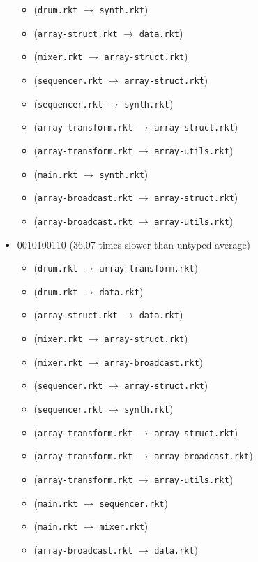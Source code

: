 \documentclass{article}
\newcommand{\mono}[1]{\texttt{#1}}
\begin{document}
\begin{itemize}
\begin{itemize}
  \item (\mono{drum.rkt} $\rightarrow$ \mono{synth.rkt})
  \item (\mono{array-struct.rkt} $\rightarrow$ \mono{data.rkt})
  \item (\mono{mixer.rkt} $\rightarrow$ \mono{array-struct.rkt})
  \item (\mono{sequencer.rkt} $\rightarrow$ \mono{array-struct.rkt})
  \item (\mono{sequencer.rkt} $\rightarrow$ \mono{synth.rkt})
  \item (\mono{array-transform.rkt} $\rightarrow$ \mono{array-struct.rkt})
  \item (\mono{array-transform.rkt} $\rightarrow$ \mono{array-utils.rkt})
  \item (\mono{main.rkt} $\rightarrow$ \mono{synth.rkt})
  \item (\mono{array-broadcast.rkt} $\rightarrow$ \mono{array-struct.rkt})
  \item (\mono{array-broadcast.rkt} $\rightarrow$ \mono{array-utils.rkt})
  \end{itemize}
\item 0010100110 (36.07 times slower than untyped average)
  \begin{itemize}
  \item (\mono{drum.rkt} $\rightarrow$ \mono{array-transform.rkt})
  \item (\mono{drum.rkt} $\rightarrow$ \mono{data.rkt})
  \item (\mono{array-struct.rkt} $\rightarrow$ \mono{data.rkt})
  \item (\mono{mixer.rkt} $\rightarrow$ \mono{array-struct.rkt})
  \item (\mono{mixer.rkt} $\rightarrow$ \mono{array-broadcast.rkt})
  \item (\mono{sequencer.rkt} $\rightarrow$ \mono{array-struct.rkt})
  \item (\mono{sequencer.rkt} $\rightarrow$ \mono{synth.rkt})
  \item (\mono{array-transform.rkt} $\rightarrow$ \mono{array-struct.rkt})
  \item (\mono{array-transform.rkt} $\rightarrow$ \mono{array-broadcast.rkt})
  \item (\mono{array-transform.rkt} $\rightarrow$ \mono{array-utils.rkt})
  \item (\mono{main.rkt} $\rightarrow$ \mono{sequencer.rkt})
  \item (\mono{main.rkt} $\rightarrow$ \mono{mixer.rkt})
  \item (\mono{array-broadcast.rkt} $\rightarrow$ \mono{data.rkt})

\end{itemize}
\end{itemize}
\end{document}
